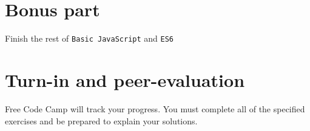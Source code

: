 \documentclass{42-en}
\begin{document}
\chapter{Bonus part}

    Finish the rest of \texttt{Basic JavaScript} and \texttt{ES6}

\chapter{Turn-in and peer-evaluation}

    Free Code Camp will track your progress. You must complete all of
the specified exercises and be prepared to explain your solutions.

\end{document}
